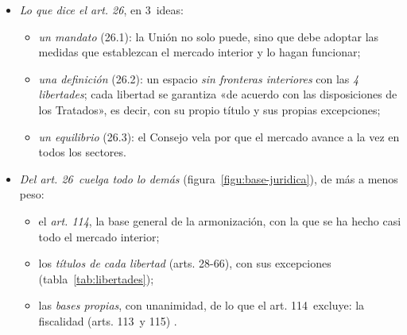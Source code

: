 \documentclass[11pt]{article}
\begin{document}
\begin{itemize}
\item \emph{Lo que dice el art. 26}, en 3~ideas:
  \begin{itemize}
  \item \emph{un mandato} (26.1): la Unión no solo puede, sino que debe adoptar las medidas que establezcan el mercado interior y lo hagan funcionar;
  \item \emph{una definición} (26.2): un espacio \emph{sin fronteras interiores} con las \emph{4 libertades}; cada libertad se garantiza «de acuerdo con las disposiciones de los Tratados», es decir, con su propio título y sus propias excepciones;
  \item \emph{un equilibrio} (26.3): el Consejo vela por que el mercado avance a la vez en todos los sectores.
  \end{itemize}
\item \emph{Del art. 26~cuelga todo lo demás} (figura~\ref{figu:base-juridica}), de más a menos peso:
  \begin{itemize}
  \item el \emph{art. 114}, la base general de la armonización, con la que se ha hecho casi todo el mercado interior;
  \item los \emph{títulos de cada libertad} (arts. 28-66), con sus excepciones (tabla~\ref{tab:libertades});
  \item las \emph{bases propias}, con unanimidad, de lo que el art. 114~excluye: la fiscalidad (arts. 113~y 115) .
  \end{itemize}
\end{itemize}

\begin{infografia}[H]
\centering
\caption{La base jurídica del mercado interior: del art. 26~a cada libertad}\label{figu:base-juridica}
\end{infografia}
\end{document}
